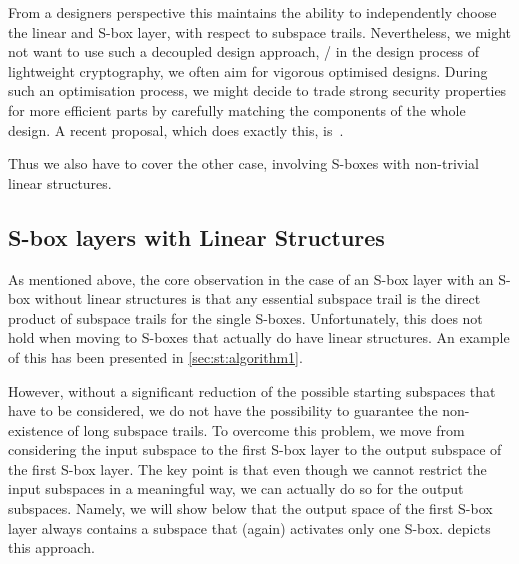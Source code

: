 From a designers perspective this maintains the ability to independently choose the linear and S-box layer, with respect to subspace trails.
Nevertheless, we might not want to use such a decoupled design approach, \eg/ in the design process of lightweight cryptography, we often aim for vigorous optimised designs.
During such an optimisation process, we might decide to trade strong security properties for more efficient parts by carefully matching the components of the whole design.
A recent proposal, which does exactly this, is~\cite{CHES:BPPSST17}.

Thus we also have to cover the other case, involving S-boxes with non-trivial linear structures.


\subsection{S-box layers with Linear Structures}\label{sec:st:algorithm2}

As mentioned above, the core observation in the case of an S-box layer with an S-box without linear structures is that any essential subspace trail is the direct product of subspace trails for the single S-boxes.
Unfortunately, this does not hold when moving to S-boxes that actually do have linear structures.
An example of this has been presented in \cref{sec:st:algorithm1}.

However, without a significant reduction of the possible starting subspaces that have to be considered, we do not have the possibility to guarantee the non-existence of long subspace trails.
To overcome this problem, we move from considering the input subspace to the first S-box layer to the output subspace of the first S-box layer.
The key point is that even though we cannot restrict the input subspaces in a meaningful way, we can actually do so for the output subspaces.
Namely, we will show below that the output space of the first S-box layer always contains a subspace that (again) activates only one S-box.
 depicts this approach.

